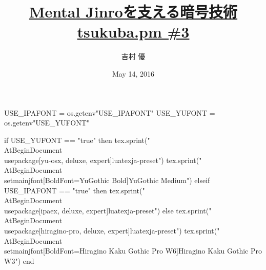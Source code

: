 \hypersetup{colorlinks,linkcolor=,urlcolor=links}

\beamertemplatenavigationsymbolsempty

\usepackage{luacode}
\usepackage{luatexja}
\usepackage{pgfpages}
\usepackage[osf]{mathpazo}

\begin{luacode*}
  USE_IPAFONT = os.getenv"USE_IPAFONT"
  USE_YUFONT = os.getenv"USE_YUFONT"
  
  if USE_YUFONT == "true" then
    tex.sprint("\\AtBeginDocument{\\usepackage[yu-osx, deluxe, expert]{luatexja-preset}}")
    tex.sprint("\\AtBeginDocument{\\setmainjfont[BoldFont=YuGothic Bold]{YuGothic Medium}}")
  elseif USE_IPAFONT == "true" then
    tex.sprint("\\AtBeginDocument{\\usepackage[ipaex, deluxe, expert]{luatexja-preset}}")
  else
    tex.sprint("\\AtBeginDocument{\\usepackage[hiragino-pro, deluxe, expert]{luatexja-preset}}")
    tex.sprint("\\AtBeginDocument{\\setmainjfont[BoldFont=Hiragino Kaku Gothic Pro W6]{Hiragino Kaku Gothic Pro W3}}")
  end
\end{luacode*}

\usepackage{epigraph}
\usepackage{etoolbox}
\usepackage{tikz}
\usepackage{framed}
\usepackage{libertine}
\usepackage[final]{listings}
\usepackage{amsmath}
\usepackage{mathtools}



\setmainfont[Numbers=OldStyle, BoldFont=Palatino Bold]{Palatino}
\setsansfont{CMU Sans Serif}
\setmonofont{CMU Typewriter Text}

\title[Mental Jinroを支える暗号技術]{%
  \href{https://github.com/y-yu/mental-jinro-slide}{Mental Jinroを支える暗号技術} \\
  \href{http://connpass.com/event/30661/}{\normalsize tsukuba.pm \#3}
}
\author{吉村 優}
\date{May 14, 2016}

